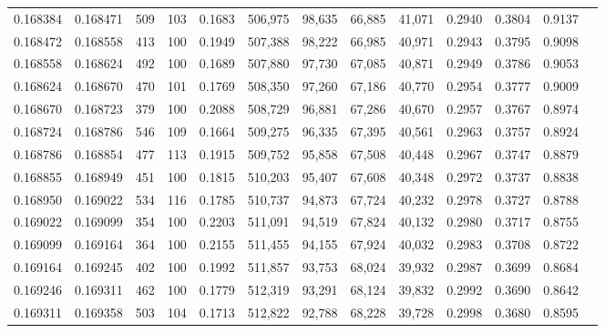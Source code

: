\begin{tabular}{rrrrrrrrrrrrr}
0.168384 & 0.168471 &   509 & 103 &                                     0.1683 & 506,975 &  98,635 &  66,885 &  41,071 & 0.2940 & 0.3804 & 0.9137 \\
0.168472 & 0.168558 &   413 & 100 &                                     0.1949 & 507,388 &  98,222 &  66,985 &  40,971 & 0.2943 & 0.3795 & 0.9098 \\
0.168558 & 0.168624 &   492 & 100 &                                     0.1689 & 507,880 &  97,730 &  67,085 &  40,871 & 0.2949 & 0.3786 & 0.9053 \\
0.168624 & 0.168670 &   470 & 101 &                                     0.1769 & 508,350 &  97,260 &  67,186 &  40,770 & 0.2954 & 0.3777 & 0.9009 \\
0.168670 & 0.168723 &   379 & 100 &                                     0.2088 & 508,729 &  96,881 &  67,286 &  40,670 & 0.2957 & 0.3767 & 0.8974 \\
0.168724 & 0.168786 &   546 & 109 &                                     0.1664 & 509,275 &  96,335 &  67,395 &  40,561 & 0.2963 & 0.3757 & 0.8924 \\
0.168786 & 0.168854 &   477 & 113 &                                     0.1915 & 509,752 &  95,858 &  67,508 &  40,448 & 0.2967 & 0.3747 & 0.8879 \\
0.168855 & 0.168949 &   451 & 100 &                                     0.1815 & 510,203 &  95,407 &  67,608 &  40,348 & 0.2972 & 0.3737 & 0.8838 \\
0.168950 & 0.169022 &   534 & 116 &                                     0.1785 & 510,737 &  94,873 &  67,724 &  40,232 & 0.2978 & 0.3727 & 0.8788 \\
0.169022 & 0.169099 &   354 & 100 &                                     0.2203 & 511,091 &  94,519 &  67,824 &  40,132 & 0.2980 & 0.3717 & 0.8755 \\
0.169099 & 0.169164 &   364 & 100 &                                     0.2155 & 511,455 &  94,155 &  67,924 &  40,032 & 0.2983 & 0.3708 & 0.8722 \\
0.169164 & 0.169245 &   402 & 100 &                                     0.1992 & 511,857 &  93,753 &  68,024 &  39,932 & 0.2987 & 0.3699 & 0.8684 \\
0.169246 & 0.169311 &   462 & 100 &                                     0.1779 & 512,319 &  93,291 &  68,124 &  39,832 & 0.2992 & 0.3690 & 0.8642 \\
0.169311 & 0.169358 &   503 & 104 &                                     0.1713 & 512,822 &  92,788 &  68,228 &  39,728 & 0.2998 & 0.3680 & 0.8595 \\

\end{tabular}
